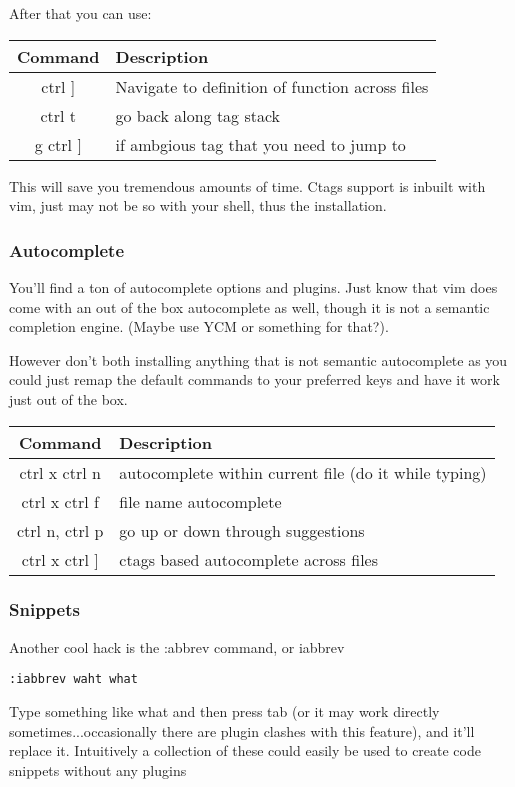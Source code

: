 \documentclass[12pt, letterpaper]{article}
\begin{document}
After that you can use:
\begin{table}[H]
    \begin{tabular}{|c|l|}
        Command & Description \\
        \hline
        ctrl ] & Navigate to definition of function across files \\
        \hline
        ctrl t & go back along tag stack \\
        \hline
        g ctrl ] & if ambgious tag that you need to jump to \\
        \hline
    \end{tabular}
\end{table}

This will save you tremendous amounts of time. Ctags support is inbuilt with
vim, just may not be so with your shell, thus the installation.

\subsubsection{Autocomplete}
You'll find a ton of autocomplete options and plugins. Just know that vim does
come with an out of the box autocomplete as well, though it is not a semantic
completion engine. (Maybe use YCM or something for that?).

However don't both installing anything that is not semantic autocomplete as you
could just remap the default commands to your preferred keys and have it work
just out of the box.
\begin{table}[H]
    \begin{tabular}{|c|l|}
        Command & Description \\
        \hline
        ctrl x ctrl n & autocomplete within current file (do it while typing) \\
        \hline
        ctrl x ctrl f & file name autocomplete \\
        \hline
        ctrl n, ctrl p & go up or down through suggestions \\
        \hline
        ctrl x ctrl ] & ctags based autocomplete across files \\
        \hline
    \end{tabular}
\end{table}

\subsubsection{Snippets}
Another cool hack is the :abbrev command, or iabbrev
\begin{verbatim}
:iabbrev waht what
\end{verbatim}
Type something like what and then press tab (or it may work directly
sometimes...occasionally there are plugin clashes with this feature), and
it'll replace it.
Intuitively a collection of these could easily be used to create code
snippets without any plugins
\end{document}
